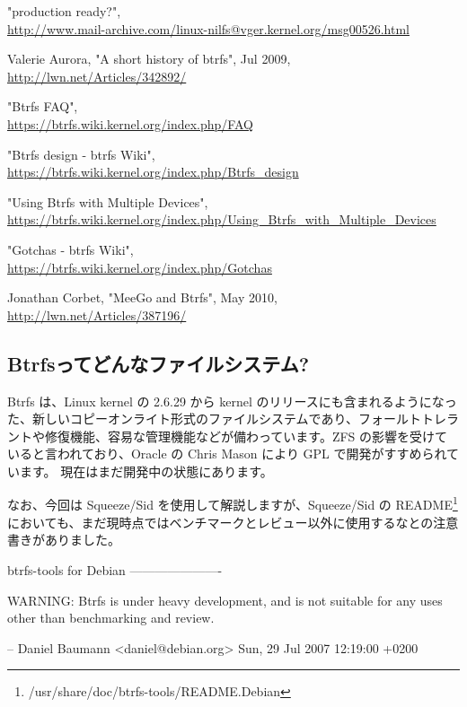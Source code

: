 \documentclass[mingoth,a4paper]{jsarticle}
\begin{document}
\begin{thebibliography}{0}
 "production ready?", \\
\url{http://www.mail-archive.com/linux-nilfs@vger.kernel.org/msg00526.html}

 Valerie Aurora, "A short history of btrfs", Jul 2009, \\
\url{http://lwn.net/Articles/342892/}

 "Btrfs FAQ", \\
\url{https://btrfs.wiki.kernel.org/index.php/FAQ}

 "Btrfs design - btrfs Wiki", \\
\url{https://btrfs.wiki.kernel.org/index.php/Btrfs\_design}

 "Using Btrfs with Multiple Devices", \\
\url{https://btrfs.wiki.kernel.org/index.php/Using\_Btrfs\_with\_Multiple\_Devices}

 "Gotchas - btrfs Wiki", \\
\url{https://btrfs.wiki.kernel.org/index.php/Gotchas}

 Jonathan Corbet, "MeeGo and Btrfs", May 2010, \\
\url{http://lwn.net/Articles/387196/}

\end{thebibliography}



\subsection{Btrfsってどんなファイルシステム?}
Btrfs は、Linux kernel の 2.6.29 から kernel のリリースにも含まれるようになった、新しいコピーオンライト形式のファイルシステムであり、フォールトトレラントや修復機能、容易な管理機能などが備わっています。ZFS の影響を受けていると言われており、Oracle の Chris Mason により GPL で開発がすすめられています。
現在はまだ開発中の状態にあります。

なお、今回は Squeeze/Sid を使用して解説しますが、Squeeze/Sid の README\footnote{/usr/share/doc/btrfs-tools/README.Debian} においても、まだ現時点ではベンチマークとレビュー以外に使用するなとの注意書きがありました。
\begin{commandline}
btrfs-tools for Debian
----------------------

WARNING: Btrfs is under heavy development, and is not suitable for any uses
other than benchmarking and review.

 -- Daniel Baumann <daniel@debian.org>  Sun, 29 Jul 2007 12:19:00 +0200
\end{commandline}
\end{document}
